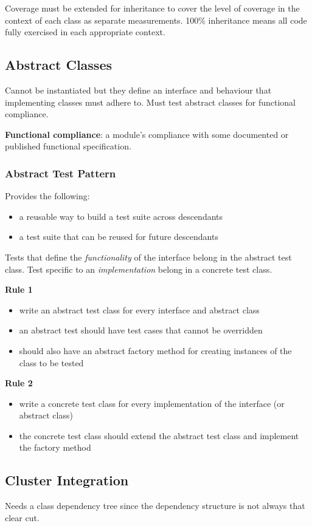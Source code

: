\documentclass[11pt]{article}
\begin{document}
Coverage must be extended for inheritance to cover the level of
coverage in the context of each class as separate measurements.
100\% inheritance means all code fully exercised in each
appropriate context.
\subsection{Abstract Classes}
\label{sec:org6cd8627}
Cannot be instantiated but they define an interface and
behaviour that implementing classes must adhere to.
Must test abstract classes for functional compliance.

\textbf{Functional compliance}: a module's compliance with some
documented or published functional specification.
\subsubsection{Abstract Test Pattern}
\label{sec:orgfbb1014}
Provides the following:
\begin{itemize}
\item a reusable way to build a test suite across descendants
\item a test suite that can be reused for future descendants
\end{itemize}

Tests that define the \emph{functionality} of the interface belong in the
abstract test class. Test specific to an \emph{implementation} belong
in a concrete test class.

\textbf{Rule 1}
\begin{itemize}
\item write an abstract test class for every interface and
abstract class
\item an abstract test should have test cases that cannot
be overridden
\item should also have an abstract factory method for creating instances
of the class to be tested
\end{itemize}

\textbf{Rule 2}
\begin{itemize}
\item write a concrete test class for every implementation
of the interface (or abstract class)
\item the concrete test class should extend the abstract test class
and implement the factory method
\end{itemize}
\subsection{Cluster Integration}
\label{sec:org07d7ea9}
Needs a class dependency tree since the dependency structure
is not always that clear cut.
\end{document}
